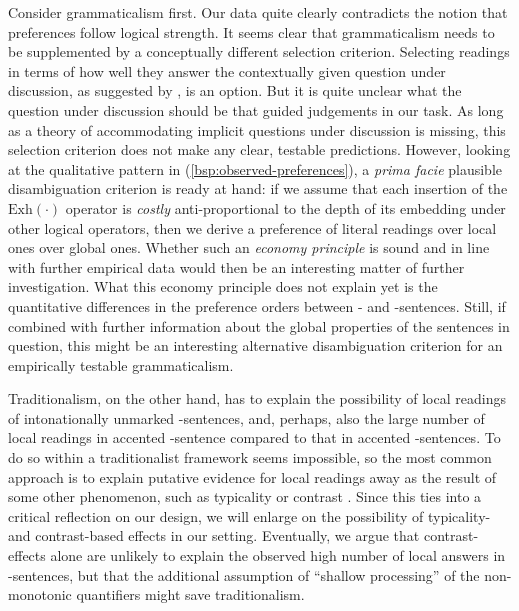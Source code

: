 \documentclass[fleqn,reqno,10pt,draft]{article}
\newcommand{\as}{\acro{as}}
\renewcommand{\es}{\acro{es}}
\newcommand{\exh}{\ensuremath{\mathrm{Exh}}}
\begin{document}
Consider grammaticalism first. Our data quite clearly contradicts the
notion that preferences follow logical strength. It seems clear that
grammaticalism needs to be supplemented by a conceptually different
selection criterion. Selecting readings in terms of how well they
answer the contextually given question under discussion, as suggested
by \citet{Fox2007:Free-Choice-and,GualminiHulsey2008:The-Question-An},
is an option. But it is quite unclear what the question under
discussion should be that guided judgements in our task. As long as a
theory of accommodating implicit questions under discussion is
missing, this selection criterion does not make any clear, testable
predictions. However, looking at the qualitative pattern in
(\ref{bsp:observed-preferences}), a \emph{prima facie} plausible
disambiguation criterion is ready at hand: if we assume that each
insertion of the $\exh(\cdot)$ operator is \emph{costly}
anti-proportional to the depth of its embedding under other logical
operators, then we derive a preference of literal readings over local
ones over global ones. Whether such an \emph{economy principle} is
sound and in line with further empirical data would then be an
interesting matter of further investigation. What this economy
principle does not explain yet is the quantitative differences in the
preference orders between \as- and \es-sentences. Still, if combined
with further information about the global properties of the sentences
in question, this might be an interesting alternative disambiguation
criterion for an empirically testable grammaticalism.

Traditionalism, on the other hand, has to explain the possibility of
local readings of intonationally unmarked \es-sentences, and, perhaps,
also the large number of local readings in accented \es-sentence
compared to that in accented \as-sentences. To do so within a
traditionalist framework seems impossible, so the most common approach
is to explain putative evidence for local readings away as the result
of some other phenomenon, such as typicality or contrast
\citep{Tielvan-Tiel2012:Embedded-Scalar,GeurtsTielvan-Tiel2013:Scalar-expressi,Tielvan-Tiel2014:Quantity-Matter}.
Since this ties into a critical reflection on our design, we will
enlarge on the possibility of typicality- and contrast-based effects
in our setting. Eventually, we argue that contrast-effects alone are
unlikely to explain the observed high number of local answers in
\es-sentences, but that the additional assumption of 
``shallow processing'' of the non-monotonic quantifiers might save
traditionalism. 
\end{document}
